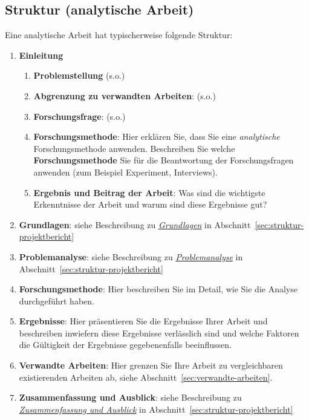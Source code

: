 \subsection{Struktur (analytische Arbeit)}

Eine analytische Arbeit hat typischerweise folgende Struktur:

\begin{enumerate}
    \item \textbf{Einleitung}
    \begin{enumerate}
        \item \textbf{Problemstellung} (s.o.)
        \item \textbf{Abgrenzung zu verwandten Arbeiten}: (s.o.)
        \item \textbf{Forschungsfrage}: (s.o.)
        \item \textbf{Forschungsmethode}: Hier erklären Sie, dass Sie eine \textit{analytische} Forschungsmethode anwenden. Beschreiben Sie welche \textbf{Forschungsmethode} Sie für die Beantwortung der Forschungsfragen anwenden (zum Beispiel Experiment, Interviews).
        \item \textbf{Ergebnis und Beitrag der Arbeit}: Was sind die wichtigste Erkenntnisse der Arbeit und warum sind diese Ergebnisse gut?
    \end{enumerate}
    
    \item \textbf{Grundlagen}: siehe Beschreibung zu \hyperref[struktur:grundlagen]{\textit{Grundlagen}}  in Abschnitt~\ref{sec:struktur-projektbericht}
    \item \textbf{Problemanalyse}: siehe Beschreibung zu \hyperref[struktur:problemanalyse]{\textit{Problemanalyse}}  in Abschnitt~\ref{sec:struktur-projektbericht}
    \item \textbf{Forschungsmethode}: Hier beschreiben Sie im Detail, wie Sie die Analyse durchgeführt haben.
    \item \textbf{Ergebnisse}: Hier präsentieren Sie die Ergebnisse Ihrer Arbeit und beschreiben inwiefern diese Ergebnisse verlässlich sind und welche Faktoren die Gültigkeit der Ergebnisse gegebenenfalls beeinflussen.
    \item \textbf{Verwandte Arbeiten}: Hier grenzen Sie Ihre Arbeit zu vergleichbaren existierenden Arbeiten ab, siehe Abschnitt~\ref{sec:verwandte-arbeiten}.
    \item \textbf{Zusammenfassung und Ausblick}:
    siehe Beschreibung zu \hyperref[struktur:zusammenfassung-ausblick]{\textit{Zusammenfassung und Ausblick}}  in Abschnitt~\ref{sec:struktur-projektbericht}    
    
\end{enumerate}

